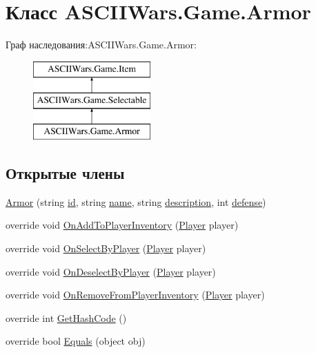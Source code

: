 \hypertarget{class_a_s_c_i_i_wars_1_1_game_1_1_armor}{}\section{Класс A\+S\+C\+I\+I\+Wars.\+Game.\+Armor}
\label{class_a_s_c_i_i_wars_1_1_game_1_1_armor}
Граф наследования\+:A\+S\+C\+I\+I\+Wars.\+Game.\+Armor\+:\begin{figure}[H]
\begin{center}
\leavevmode
\includegraphics[height=3.000000cm]{class_a_s_c_i_i_wars_1_1_game_1_1_armor}
\end{center}
\end{figure}
\subsection*{Открытые члены}
\begin{DoxyCompactItemize}
\item 
\hyperlink{class_a_s_c_i_i_wars_1_1_game_1_1_armor_a3286b25da22682e4773667888ee99cf9}{Armor} (string \hyperlink{class_a_s_c_i_i_wars_1_1_game_1_1_item_a744d51f7684a4e46a1f834f8666db58e}{id}, string \hyperlink{class_a_s_c_i_i_wars_1_1_game_1_1_item_a994b9ec5f10c123e4345da159c090091}{name}, string \hyperlink{class_a_s_c_i_i_wars_1_1_game_1_1_item_a6ff41e953ccebc64a8df8f8c434535a0}{description}, int \hyperlink{class_a_s_c_i_i_wars_1_1_game_1_1_armor_ac056d4feeb6864656f00144af7a4ed8b}{defense})
\item 
override void \hyperlink{class_a_s_c_i_i_wars_1_1_game_1_1_armor_ab8e1364e91ddd19f7c214f051b054cd8}{On\+Add\+To\+Player\+Inventory} (\hyperlink{class_a_s_c_i_i_wars_1_1_game_1_1_player}{Player} player)
\item 
override void \hyperlink{class_a_s_c_i_i_wars_1_1_game_1_1_armor_ab4f8a39af009eef4bbdeb6db67fb9cd5}{On\+Select\+By\+Player} (\hyperlink{class_a_s_c_i_i_wars_1_1_game_1_1_player}{Player} player)
\item 
override void \hyperlink{class_a_s_c_i_i_wars_1_1_game_1_1_armor_af502379d334f2fc7901638f8a8eba130}{On\+Deselect\+By\+Player} (\hyperlink{class_a_s_c_i_i_wars_1_1_game_1_1_player}{Player} player)
\item 
override void \hyperlink{class_a_s_c_i_i_wars_1_1_game_1_1_armor_ab113733825094b12aba14b8b48372f9c}{On\+Remove\+From\+Player\+Inventory} (\hyperlink{class_a_s_c_i_i_wars_1_1_game_1_1_player}{Player} player)
\item 
override int \hyperlink{class_a_s_c_i_i_wars_1_1_game_1_1_armor_a7abccb710e5f53baf59b4184140d907e}{Get\+Hash\+Code} ()
\item 
override bool \hyperlink{class_a_s_c_i_i_wars_1_1_game_1_1_armor_a2cb86fcb3169af675628bd2ab7e00036}{Equals} (object obj)
\end{DoxyCompactItemize}

